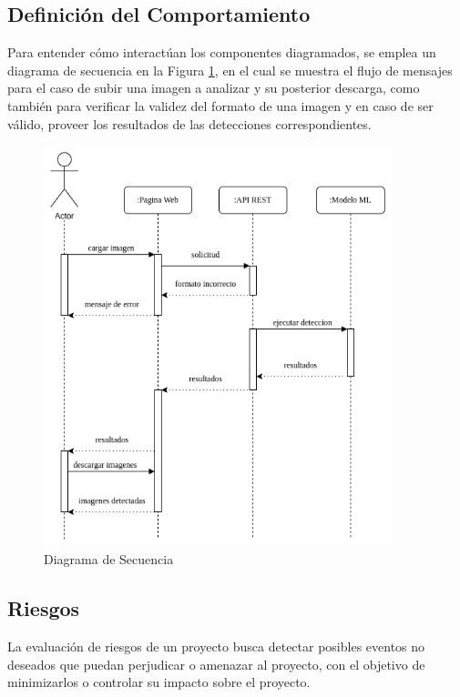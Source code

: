 \newpage
\subsection{Definición del Comportamiento}

Para entender cómo interactúan los componentes diagramados, se emplea un diagrama de secuencia en la Figura \ref{fig:secuencia}, en el cual se muestra el flujo de mensajes para el caso de subir una imagen a analizar y su posterior descarga, como también para verificar la validez del formato de una imagen y en caso de ser válido, proveer los resultados de las detecciones correspondientes.

\begin{figure}[h!]
    \centering
    \includegraphics[width=0.9\textwidth]{img/Diagrama de Secuencia.drawio.png}
    \caption{Diagrama de Secuencia}
    \label{fig:secuencia}
\end{figure}


\subsection{Riesgos}

La evaluación de riesgos de un proyecto busca detectar posibles eventos no deseados que puedan perjudicar o amenazar al proyecto, con el objetivo de minimizarlos o controlar su impacto sobre el proyecto.

